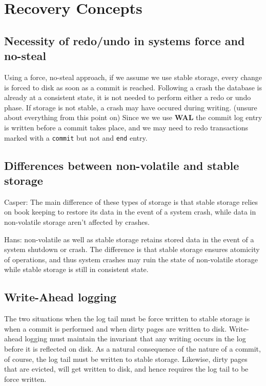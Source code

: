 
\section{Recovery Concepts}

\subsection{Necessity of redo/undo in systems force and no-steal}
Using a force, no-steal approach, if we assume we use stable storage,
every change is forced to disk as soon as a commit is reached. Following a
crash the database is already at a consistent state, it is not needed to
perform either a redo or undo phase. If storage is not stable, a crash may
have occured during writing. (unsure about everything from this point on)
Since we we use {\bf WAL} the commit log entry is written before a commit
takes place, and we may need to redo transactions marked with a {\tt commit} but not and {\tt end} entry.

\subsection{Differences between non-volatile and stable storage}
Casper:
The main difference of these types of storage is that stable storage relies on
book keeping to restore its data in the event of a system crash, while data in
non-volatile storage aren't affected by crashes.

Hans:
non-volatile as well as stable storage retains stored data in the event of a
system shutdown or crash. The difference is that stable storage ensures
atomicity of operations, and thus system crashes may ruin the state of
non-volatile storage while stable storage is still in consistent state.

\subsection{Write-Ahead logging}

The two situations when the log tail must be force written to stable storage
is when a commit is performed and when dirty pages are written to disk.
Write-ahead logging must maintain the invariant that any writing occurs in the
log before it is reflected on disk. As a natural consequence of the nature of
a commit, of course, the log tail must be written to stable storage. Likewise,
dirty pages that are evicted, will get written to disk, and hence requires the
log tail to be force written.

